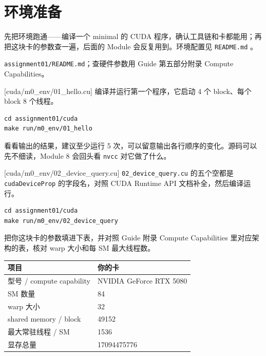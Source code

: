 \documentclass[11pt,a4paper,fontset=none]{ctexart}
\begin{document}
\setcounter{section}{-1}

\section{环境准备}

先把环境跑通——编译一个 minimal 的 CUDA 程序，确认工具链和卡都能用；再把这块卡的参数查一遍，后面的 Module 会反复用到。环境配置见 \texttt{README.md} 。

\begin{reading}
\texttt{assignment01/README.md}；查硬件参数用 Guide 第五部分附录 Compute Capabilities。
\end{reading}

[cuda/m0\_env/01\_hello.cu]
编译并运行第一个程序，它启动 4 个 block、每个 block 8 个线程。

\begin{lstlisting}
cd assignment01/cuda
make run/m0_env/01_hello
\end{lstlisting}

看看输出的结果，建议至少运行 5 次，可以留意输出各行顺序的变化。源码可以先不细读，Module 8 会回头看 \texttt{nvcc} 对它做了什么。

[cuda/m0\_env/02\_device\_query.cu]
\texttt{02\_device\_query.cu} 的五个空都是 \texttt{cudaDeviceProp} 的字段名，对照 CUDA Runtime API 文档补全，然后编译运行。

\begin{lstlisting}
cd assignment01/cuda
make run/m0_env/02_device_query
\end{lstlisting}

把你这块卡的参数填进下表，并对照 Guide 附录 Compute Capabilities 里对应架构的表，核对 warp 大小和每 SM 最大线程数。

\begin{center}\small
\begin{tabular}{@{}ll@{}}
\toprule
项目 & 你的卡 \\
\midrule
型号 / compute capability & NVIDIA GeForce RTX 5080 \\
SM 数量 & 84 \\
warp 大小 & 32 \\
shared memory / block & 49152 \\
最大常驻线程 / SM & 1536 \\
显存总量 & 17094475776 \\
\bottomrule
\end{tabular}
\end{center}
\end{document}
